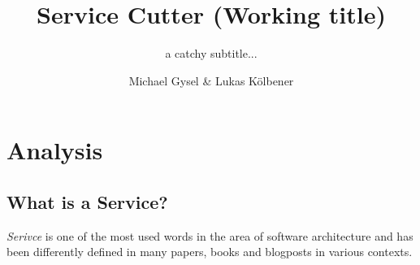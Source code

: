 \documentclass[hsr-ba,english]{hgbthesis}
\begin{document}

\bigskipamount=30pt

\title{Service Cutter (Working title)}
\subtitle{a catchy subtitle...}
\author{Michael Gysel \& Lukas K\"{o}lbener}



\frontmatter
\maketitle
\setcounter{tocdepth}{1}
\tableofcontents

			

\mainmatter         %

\makeatletter
\renewcommand{\@makechapterhead}[1]{%
\vspace*{50 pt}%
{\setlength{\parindent}{0pt} \raggedright \normalfont
\bfseries\Huge\thechapter.\ #1
\par\nobreak\vspace{40 pt}}}
\makeatother





\chapter{Analysis}
\label{cha:analysis}

\section{What is a Service?}

\textit{Serivce} is one of the most used words in the area of software architecture and has been differently defined in many papers, books and blogposts in various contexts. 
\end{document}
